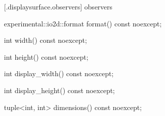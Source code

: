  [\iotwod.displaysurface.observers]{ observers}

\begin{itemdecl}
    experimental::io2d::format format() const noexcept;
\end{itemdecl}
\begin{itemdescr}
	\pnum
	\returns

\end{itemdescr}

\begin{itemdecl}
    int width() const noexcept;
\end{itemdecl}
\begin{itemdescr}
	\pnum
	\returns
	
\end{itemdescr}

\begin{itemdecl}
    int height() const noexcept;
\end{itemdecl}
\begin{itemdescr}
	\pnum
	\returns
	
\end{itemdescr}

\begin{itemdecl}
    int display_width() const noexcept;
\end{itemdecl}
\begin{itemdescr}
	\pnum
	\returns
	
\end{itemdescr}

\begin{itemdecl}
    int display_height() const noexcept;
\end{itemdecl}
\begin{itemdescr}
	\pnum
	\returns
	
\end{itemdescr}

\begin{itemdecl}
    tuple<int, int> dimensions() const noexcept;
\end{itemdecl}
\begin{itemdescr}
	\pnum
	\returns
	
\end{itemdescr}

